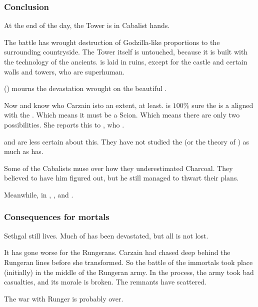 \subsubsection{Conclusion}
At the end of the day, the Tower is in Cabalist hands. 

The battle has wrought destruction of Godzilla-like proportions to the surrounding countryside. The Tower itself is untouched, because it is built with the technology of the ancients. \Forclin{} is laid in ruins, except for the castle and certain walls and towers, who are superhuman. 

\Nzessuacrith{} () mourns the devastation wrought on the beautiful \Forclin. 

Now \Achsah{} and \Nzessuacrith{} know who Carzain is\dash to an extent, at least.
\Achsah{} is $100\%$ sure the \vertex{} is a \sathariah{} aligned with the . 
Which means it must be a Scion. 
Which means there are only two possibilities. 
She reports this to \Azraid, who . 

\Nzessuacrith{} and \Ishnaruchaefir{} are less certain about this. 
They have not studied the \vertex{} (or the theory of \malachim) as much as \Achsah{} has. 

Some of the Cabalists muse over how they underestimated Charcoal. 
They believed to have him figured out, but he still managed to thwart their plans. 

Meanwhile, in \Malcur, , and .





\subsubsection{Consequences for mortals}
Sethgal still lives. 
Much of \Forclin has been devastated, but all is not lost. 

It has gone worse for the Rungerans. 
Carzain had chased \Takestsha deep behind the Rungeran lines before she transformed.
So the battle of the immortals took place (initially) in the middle of the Rungeran army. 
In the process, the army took bad casualties, and its morale is broken. 
The remnants have scattered. 

The war with Runger is probably over. 

